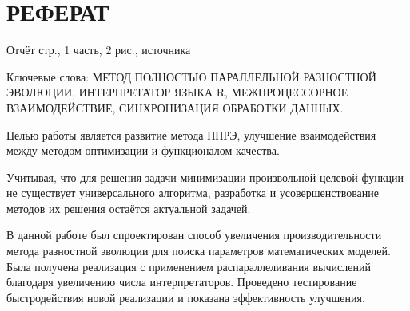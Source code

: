 \chapter*{РЕФЕРАТ}

Отчёт \pageref{LastPage} стр., 1 часть, 2 рис.,  источника

Ключевые слова:
МЕТОД ПОЛНОСТЬЮ ПАРАЛЛЕЛЬНОЙ РАЗНОСТНОЙ ЭВОЛЮЦИИ,
ИНТЕРПРЕТАТОР ЯЗЫКА R,
МЕЖПРОЦЕССОРНОЕ ВЗАИМОДЕЙСТВИЕ,
СИНХРОНИЗАЦИЯ ОБРАБОТКИ ДАННЫХ.

Целью работы является развитие
метода ППРЭ,
улучшение взаимодействия между методом оптимизации
и функционалом качества.

Учитывая, что для решения задачи
минимизации произвольной целевой функции
не существует универсального алгоритма,
разработка и усовершенствование
методов их решения остаётся актуальной задачей.

В данной работе был спроектирован
способ увеличения производительности
метода разностной эволюции
для поиска параметров математических моделей.
Была получена реализация
с применением распараллеливания вычислений
благодаря увеличению числа интерпретаторов.
Проведено тестирование быстродействия
новой реализации и показана эффективность улучшения.


